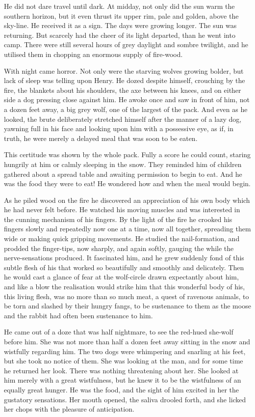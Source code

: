 \documentclass[10pt]{book}
\begin{document}
He did not dare travel until dark. At midday, not only did the sun warm
the southern horizon, but it even thrust its upper rim, pale and
golden, above the sky-line. He received it as a sign. The days were
growing longer. The sun was returning. But scarcely had the cheer of
its light departed, than he went into camp. There were still several
hours of grey daylight and sombre twilight, and he utilised them in
chopping an enormous supply of fire-wood.

With night came horror. Not only were the starving wolves growing
bolder, but lack of sleep was telling upon Henry. He dozed despite
himself, crouching by the fire, the blankets about his shoulders, the
axe between his knees, and on either side a dog pressing close against
him. He awoke once and saw in front of him, not a dozen feet away, a
big grey wolf, one of the largest of the pack. And even as he looked,
the brute deliberately stretched himself after the manner of a lazy
dog, yawning full in his face and looking upon him with a possessive
eye, as if, in truth, he were merely a delayed meal that was soon to be
eaten.

This certitude was shown by the whole pack. Fully a score he could
count, staring hungrily at him or calmly sleeping in the snow. They
reminded him of children gathered about a spread table and awaiting
permission to begin to eat. And he was the food they were to eat! He
wondered how and when the meal would begin.

As he piled wood on the fire he discovered an appreciation of his own
body which he had never felt before. He watched his moving muscles and
was interested in the cunning mechanism of his fingers. By the light of
the fire he crooked his fingers slowly and repeatedly now one at a
time, now all together, spreading them wide or making quick gripping
movements. He studied the nail-formation, and prodded the finger-tips,
now sharply, and again softly, gauging the while the nerve-sensations
produced. It fascinated him, and he grew suddenly fond of this subtle
flesh of his that worked so beautifully and smoothly and delicately.
Then he would cast a glance of fear at the wolf-circle drawn
expectantly about him, and like a blow the realisation would strike him
that this wonderful body of his, this living flesh, was no more than so
much meat, a quest of ravenous animals, to be torn and slashed by their
hungry fangs, to be sustenance to them as the moose and the rabbit had
often been sustenance to him.

He came out of a doze that was half nightmare, to see the red-hued
she-wolf before him. She was not more than half a dozen feet away
sitting in the snow and wistfully regarding him. The two dogs were
whimpering and snarling at his feet, but she took no notice of them.
She was looking at the man, and for some time he returned her look.
There was nothing threatening about her. She looked at him merely with
a great wistfulness, but he knew it to be the wistfulness of an equally
great hunger. He was the food, and the sight of him excited in her the
gustatory sensations. Her mouth opened, the saliva drooled forth, and
she licked her chops with the pleasure of anticipation.
\end{document}
